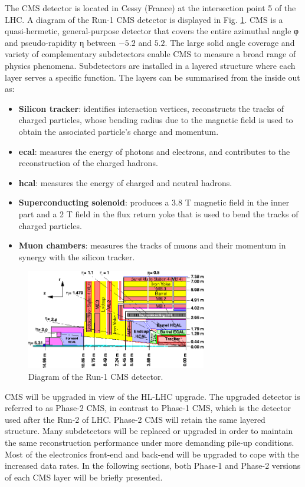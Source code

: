 \documentclass[../../main.tex]{subfiles}
\begin{document}
The CMS detector is located in Cessy (France) at the intersection point 5 of the LHC. A diagram of the Run-1 CMS detector is displayed in Fig. \ref{fig:CMS_old}. CMS is a quasi-hermetic, general-purpose detector that covers the entire azimuthal angle φ and pseudo-rapidity η between $-5.2$ and $5.2$. The large solid angle coverage and variety of complementary subdetectors enable CMS to measure a broad range of physics phenomena. Subdetectors are installed in a layered structure where each layer serves a specific function. The layers can be summarised from the inside out as:
\begin{itemize}
    \item \textbf{Silicon tracker}: identifies interaction vertices, reconstructs the tracks of charged particles, whose bending radius due to the magnetic field is used to obtain the associated particle’s charge and momentum.
    \item \textbf{\acrfull{ecal}}: measures the energy of photons and electrons, and contributes to the reconstruction of the charged hadrons.
    \item \textbf{\acrfull{hcal}}: measures the energy of charged and neutral hadrons.
    \item \textbf{Superconducting solenoid}: produces a 3.8 T magnetic field in the inner part and a 2 T field in the flux return yoke that is used to bend the tracks of charged particles.
    \item \textbf{Muon chambers}: measures the tracks of muons and their momentum in synergy with the silicon tracker.
\end{itemize}

\begin{figure}[h]
    \centering
    \includegraphics[width=0.7\textwidth]{sections/02/Images/CMS_OLD.png}
    \caption{Diagram of the Run-1 CMS detector.}
    \label{fig:CMS_old}
\end{figure}

CMS will be upgraded in view of the HL-LHC upgrade. The upgraded detector is referred to as Phase-2 CMS, in contrast to Phase-1 CMS, which is the detector used after the Run-2 of LHC. Phase-2 CMS will retain the same layered structure. Many subdetectors will be replaced or upgraded in order to maintain the same reconstruction performance under more demanding pile-up conditions. Most of the electronics front-end and back-end will be upgraded to cope with the increased data rates. In the following sections, both Phase-1 and Phase-2 versions of each CMS layer will be briefly presented.
        
\end{document}

